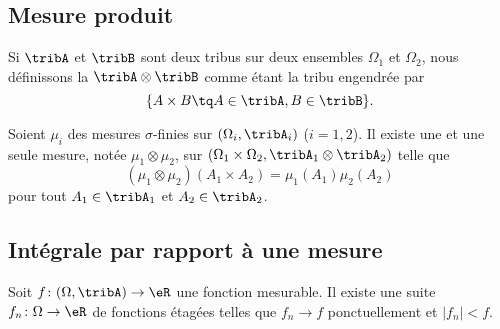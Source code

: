 \subsection{Mesure produit}

\begin{definition}      \label{DefTribProfGfYTuR}
    Si \( \tribA\) et \( \tribB\) sont deux tribus sur deux ensembles \( \Omega_1\) et \( \Omega_2\), nous définissons la  \( \tribA\otimes\tribB\) comme étant la tribu engendrée par 
    \begin{equation}
        \{ A\times B\tq A\in\tribA,B\in\tribB \}.
    \end{equation}
\end{definition}

\begin{theorem}
    Soient \( \mu_i\) des mesures $\sigma$-finies sur \( (\Omega_i,\tribA_i)\) (\( i=1,2\)). Il existe une et une seule mesure, notée \( \mu_1\otimes \mu_2\), sur \( (\Omega_1\times\Omega_2,\tribA_1\otimes\tribA_2)\) telle que
    \begin{equation}
        (\mu_1\otimes\mu_2)(A_1\times A_2)=\mu_1(A_1)\mu_2(A_2)
    \end{equation}
    pour tout \( A_1\in \tribA_1\) et \( A_2\in\tribA_2\).
\end{theorem}

\subsection{Intégrale par rapport à une mesure}

\begin{lemma}    \label{LemYFoWqmS}
    Soit \( f\colon (\Omega,\tribA)\to \eR\) une fonction mesurable. Il existe une suite \( f_n\colon \Omega\to \eR\) de fonctions étagées telles que \( f_n\to f\) ponctuellement et \( | f_n |<f\).
\end{lemma}

